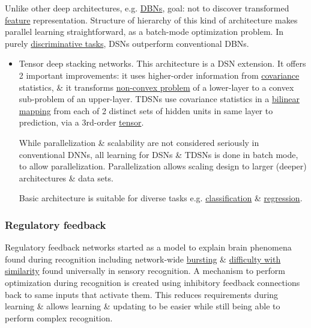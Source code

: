 \documentclass{article}
\begin{document}
\begin{itemize}
	Unlike other deep architectures, e.g. \href{https://en.wikipedia.org/wiki/Deep_belief_network}{DBNs}, goal: not to discover transformed \href{https://en.wikipedia.org/wiki/Feature_(machine_learning)}{feature} representation. Structure of hierarchy of this kind of architecture makes parallel learning straightforward, as a batch-mode optimization problem. In purely \href{https://en.wikipedia.org/wiki/Discriminative_model}{discriminative tasks}, DSNs outperform conventional DBNs.
	\begin{itemize}
		\item {\sf Tensor deep stacking networks.} This architecture is a DSN extension. It offers 2 important improvements: it uses higher-order information from \href{https://en.wikipedia.org/wiki/Covariance}{covariance} statistics, \& it transforms \href{https://en.wikipedia.org/wiki/Convex_optimization}{non-convex problem} of a lower-layer to a convex sub-problem of an upper-layer. TDSNs use covariance statistics in a \href{https://en.wikipedia.org/wiki/Bilinear_map}{bilinear mapping} from each of 2 distinct sets of hidden units in same layer to prediction, via a 3rd-order \href{https://en.wikipedia.org/wiki/Tensor}{tensor}.
		
		While parallelization \& scalability are not considered seriously in conventional DNNs, all learning for DSNs \& TDSNs is done in batch mode, to allow parallelization. Parallelization allows scaling design to larger (deeper) architectures \& data sets.
		
		Basic architecture is suitable for diverse tasks e.g. \href{https://en.wikipedia.org/wiki/Statistical_classification}{classification} \& \href{https://en.wikipedia.org/wiki/Regression_analysis}{regression}.
	\end{itemize}
\end{itemize}

\subsubsection{Regulatory feedback}
Regulatory feedback networks started as a model to explain brain phenomena found during recognition including network-wide \href{https://en.wikipedia.org/wiki/Bursting}{bursting} \& \href{https://en.wikipedia.org/wiki/Visual_search}{difficulty with similarity} found universally in sensory recognition. A mechanism to perform optimization during recognition is created using inhibitory feedback connections back to same inputs that activate them. This reduces requirements during learning \& allows learning \& updating to be easier while still being able to perform complex recognition.
\end{document}

